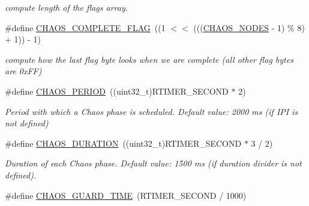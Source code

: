 \begin{DoxyCompactItemize}
\begin{DoxyCompactList}\small\item\em compute length of the flags array. \end{DoxyCompactList}\item 
\hypertarget{group__chaos-test-settings_ga0d2f1494f226d83b044e0af291496af7}{\#define \hyperlink{group__chaos-test-settings_ga0d2f1494f226d83b044e0af291496af7}{C\-H\-A\-O\-S\-\_\-\-C\-O\-M\-P\-L\-E\-T\-E\-\_\-\-F\-L\-A\-G}~((1 $<$$<$ (((\hyperlink{group__chaos-test-settings_ga60caa3837557044dab47a0e8f074133f}{C\-H\-A\-O\-S\-\_\-\-N\-O\-D\-E\-S} -\/ 1) \% 8) + 1)) -\/ 1)}\label{group__chaos-test-settings_ga0d2f1494f226d83b044e0af291496af7}

\begin{DoxyCompactList}\small\item\em compute how the last flag byte looks when we are complete (all other flag bytes are 0x\-F\-F) \end{DoxyCompactList}\item 
\hypertarget{group__chaos-test-settings_ga9eb9256366e6e80d689339627c9b016a}{\#define \hyperlink{group__chaos-test-settings_ga9eb9256366e6e80d689339627c9b016a}{C\-H\-A\-O\-S\-\_\-\-P\-E\-R\-I\-O\-D}~((uint32\-\_\-t)R\-T\-I\-M\-E\-R\-\_\-\-S\-E\-C\-O\-N\-D $\ast$ 2)}\label{group__chaos-test-settings_ga9eb9256366e6e80d689339627c9b016a}

\begin{DoxyCompactList}\small\item\em Period with which a Chaos phase is scheduled. Default value\-: 2000 ms (if I\-P\-I is not defined) \end{DoxyCompactList}\item 
\hypertarget{group__chaos-test-settings_ga41b1c21c8fdb8d06878a6da529bd0da7}{\#define \hyperlink{group__chaos-test-settings_ga41b1c21c8fdb8d06878a6da529bd0da7}{C\-H\-A\-O\-S\-\_\-\-D\-U\-R\-A\-T\-I\-O\-N}~((uint32\-\_\-t)R\-T\-I\-M\-E\-R\-\_\-\-S\-E\-C\-O\-N\-D $\ast$ 3 / 2)}\label{group__chaos-test-settings_ga41b1c21c8fdb8d06878a6da529bd0da7}

\begin{DoxyCompactList}\small\item\em Duration of each Chaos phase. Default value\-: 1500 ms (if duration divider is not defined). \end{DoxyCompactList}\item 
\hypertarget{group__chaos-test-settings_gaeff8523b0c9347628bd55d607da5460d}{\#define \hyperlink{group__chaos-test-settings_gaeff8523b0c9347628bd55d607da5460d}{C\-H\-A\-O\-S\-\_\-\-G\-U\-A\-R\-D\-\_\-\-T\-I\-M\-E}~(R\-T\-I\-M\-E\-R\-\_\-\-S\-E\-C\-O\-N\-D / 1000)}\label{group__chaos-test-settings_gaeff8523b0c9347628bd55d607da5460d}


\end{DoxyCompactItemize}
